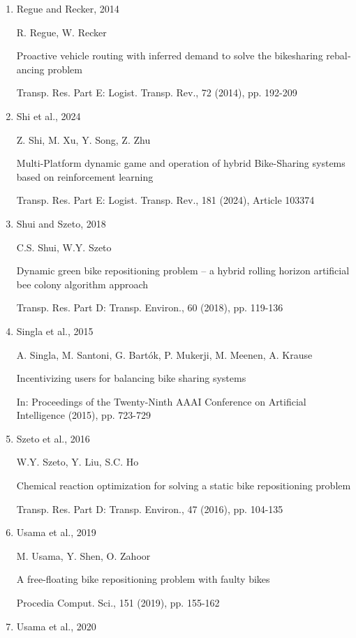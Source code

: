 \documentclass[
  english,
]{article}
\begin{document}
\begin{otherlanguage}{english}
\begin{enumerate}
  T. Raviv, M. Tzur, I.A. Forma

  Static repositioning in a bike-sharing system: models and solution approaches

  Eur. J. Transp. Logist., 2 (3) (2013), pp. 187-229
\item
  Regue and Recker, 2014

  R. Regue, W. Recker

  Proactive vehicle routing with inferred demand to solve the bikesharing rebalancing problem

  Transp. Res. Part E: Logist. Transp. Rev., 72 (2014), pp. 192-209
\item
  Shi et al., 2024

  Z. Shi, M. Xu, Y. Song, Z. Zhu

  Multi-Platform dynamic game and operation of hybrid Bike-Sharing systems based on reinforcement
  learning

  Transp. Res. Part E: Logist. Transp. Rev., 181 (2024), Article 103374
\item
  Shui and Szeto, 2018

  C.S. Shui, W.Y. Szeto

  Dynamic green bike repositioning problem -- a hybrid rolling horizon artificial bee colony
  algorithm approach

  Transp. Res. Part D: Transp. Environ., 60 (2018), pp. 119-136
\item
  Singla et al., 2015

  A. Singla, M. Santoni, G. Bartók, P. Mukerji, M. Meenen, A. Krause

  Incentivizing users for balancing bike sharing systems

  In: Proceedings of the Twenty-Ninth AAAI Conference on Artificial Intelligence (2015), pp. 723-729
\item
  Szeto et al., 2016

  W.Y. Szeto, Y. Liu, S.C. Ho

  Chemical reaction optimization for solving a static bike repositioning problem

  Transp. Res. Part D: Transp. Environ., 47 (2016), pp. 104-135
\item
  Usama et al., 2019

  M. Usama, Y. Shen, O. Zahoor

  A free-floating bike repositioning problem with faulty bikes

  Procedia Comput. Sci., 151 (2019), pp. 155-162
\item
  Usama et al., 2020


\end{enumerate}
\end{otherlanguage}
\end{document}
